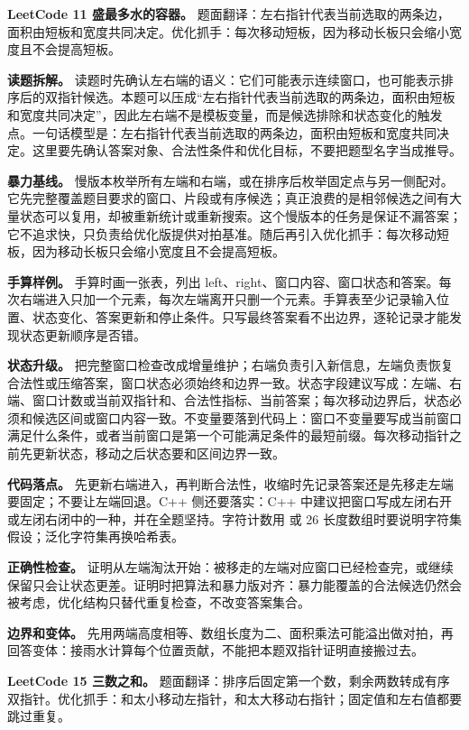 \noindent\textbf{LeetCode 11 盛最多水的容器。} 题面翻译：左右指针代表当前选取的两条边，面积由短板和宽度共同决定。优化抓手：每次移动短板，因为移动长板只会缩小宽度且不会提高短板。

\textbf{读题拆解。} 读题时先确认左右端的语义：它们可能表示连续窗口，也可能表示排序后的双指针候选。本题可以压成“左右指针代表当前选取的两条边，面积由短板和宽度共同决定”，因此左右端不是模板变量，而是候选排除和状态变化的触发点。一句话模型是：左右指针代表当前选取的两条边，面积由短板和宽度共同决定。这里要先确认答案对象、合法性条件和优化目标，不要把题型名字当成推导。

\textbf{暴力基线。} 慢版本枚举所有左端和右端，或在排序后枚举固定点与另一侧配对。它先完整覆盖题目要求的窗口、片段或有序候选；真正浪费的是相邻候选之间有大量状态可以复用，却被重新统计或重新搜索。这个慢版本的任务是保证不漏答案；它不追求快，只负责给优化版提供对拍基准。随后再引入优化抓手：每次移动短板，因为移动长板只会缩小宽度且不会提高短板。

\textbf{手算样例。} 手算时画一张表，列出 left、right、窗口内容、窗口状态和答案。每次右端进入只加一个元素，每次左端离开只删一个元素。手算表至少记录输入位置、状态变化、答案更新和停止条件。只写最终答案看不出边界，逐轮记录才能发现状态更新顺序是否错。

\textbf{状态升级。} 把完整窗口检查改成增量维护；右端负责引入新信息，左端负责恢复合法性或压缩答案，窗口状态必须始终和边界一致。状态字段建议写成：左端、右端、窗口计数或当前双指针和、合法性指标、当前答案；每次移动边界后，状态必须和候选区间或窗口内容一致。不变量要落到代码上：窗口不变量要写成当前窗口满足什么条件，或者当前窗口是第一个可能满足条件的最短前缀。每次移动指针之前先更新状态，移动之后状态要和区间边界一致。

\textbf{代码落点。} 先更新右端进入，再判断合法性，收缩时先记录答案还是先移走左端要固定；不要让左端回退。C++ 侧还要落实：C++ 中建议把窗口写成左闭右开或左闭右闭中的一种，并在全题坚持。字符计数用  或 26 长度数组时要说明字符集假设；泛化字符集再换哈希表。

\textbf{正确性检查。} 证明从左端淘汰开始：被移走的左端对应窗口已经检查完，或继续保留只会让状态更差。证明时把算法和暴力版对齐：暴力能覆盖的合法候选仍然会被考虑，优化结构只替代重复检查，不改变答案集合。

\textbf{边界和变体。} 先用两端高度相等、数组长度为二、面积乘法可能溢出做对拍，再回答变体：接雨水计算每个位置贡献，不能把本题双指针证明直接搬过去。

\noindent\textbf{LeetCode 15 三数之和。} 题面翻译：排序后固定第一个数，剩余两数转成有序双指针。优化抓手：和太小移动左指针，和太大移动右指针；固定值和左右值都要跳过重复。


